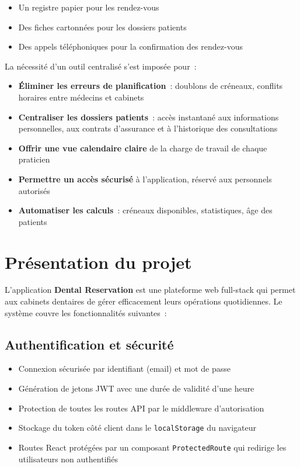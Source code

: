 \begin{itemize}
    \item Un registre papier pour les rendez-vous
    \item Des fiches cartonnées pour les dossiers patients
    \item Des appels téléphoniques pour la confirmation des rendez-vous
\end{itemize}

La nécessité d'un outil centralisé s'est imposée pour~:

\begin{itemize}
    \item \textbf{Éliminer les erreurs de planification}~: doublons de créneaux, conflits horaires entre médecins et cabinets
    \item \textbf{Centraliser les dossiers patients}~: accès instantané aux informations personnelles, aux contrats d'assurance et à l'historique des consultations
    \item \textbf{Offrir une vue calendaire claire} de la charge de travail de chaque praticien
    \item \textbf{Permettre un accès sécurisé} à l'application, réservé aux personnels autorisés
    \item \textbf{Automatiser les calculs}~: créneaux disponibles, statistiques, âge des patients
\end{itemize}

\section{Présentation du projet}

L'application \textbf{Dental Reservation} est une plateforme web full-stack qui permet aux cabinets dentaires de gérer efficacement leurs opérations quotidiennes. Le système couvre les fonctionnalités suivantes~:

\subsection{Authentification et sécurité}
\begin{itemize}
    \item Connexion sécurisée par identifiant (email) et mot de passe
    \item Génération de jetons JWT avec une durée de validité d'une heure
    \item Protection de toutes les routes API par le middleware d'autorisation
    \item Stockage du token côté client dans le \texttt{localStorage} du navigateur
    \item Routes React protégées par un composant \texttt{ProtectedRoute} qui redirige les utilisateurs non authentifiés
\end{itemize}

